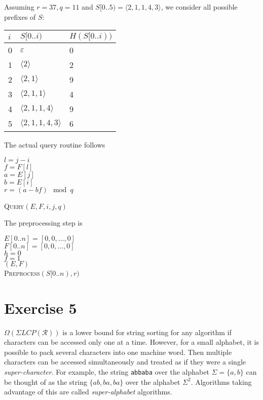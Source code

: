 \documentclass[10pt]{article}
\begin{document}
Assuming $r = 37, q = 11$ and $S[0..5) = \langle 2, 1, 1, 4, 3 \rangle$, we consider all possible prefixes of $S$:
\begin{center}
\begin{tabular}{|l|l|l|}
\hline
$i$ & $S[0..i)$ & $H(S[0..i))$ \\
\hline
0 & $ \varepsilon $ 								& 0 \\
1 & $\langle 2 \rangle $ 					& 2 \\
2 & $\langle 2, 1 \rangle $ 				& 9 \\
3 & $\langle 2, 1, 1 \rangle $ 			& 4 \\
4 & $\langle 2, 1, 1, 4 \rangle $ 		& 9 \\
5 & $\langle 2, 1, 1, 4, 3 \rangle $ & 6\\
\hline
\end{tabular}
\end{center}
The actual query routine follows
\begin{algorithm}
$l = j - i$ \\
$f = F[l]$ \\
$a = E[j]$ \\
$b = E[i]$ \\
$r = (a - bf) \mod q $ \\
\caption{\textsc{Query}$(E, F, i, j, q)$}
\end{algorithm}
The preprocessing step is
\begin{algorithm}
$E[0..n] = [0, 0, \dots, 0]$ \\
$F[0..n] = [0, 0, \dots, 0]$ \\
$h = 0$ \\
$f = 1$ \\
\KwRet $(E, F)$ \\
\caption{\textsc{Preprocess}$(S[0..n), r)$}
\end{algorithm}

\section*{Exercise 5}
\color{blue}
$\Omega(\Sigma LCP(\mathcal{R}))$ is a lower bound for string sorting for any algorithm if characters can be accessed only one at a time. However, for a small alphabet, it is possible to pack several characters into one machine word. Then multiple characters can be accessed simultaneously and treated as if they were a single \textit{super-character}. For example, the string \texttt{abbaba} over the alphabet $\Sigma = \{ a, b\}$ can be thought of as the string $\{ ab, ba, ba\}$ over the alphabet $\Sigma^2$. Algorithms taking advantage of this are called \textit{super-alphabet} algorithms.
\end{document}
